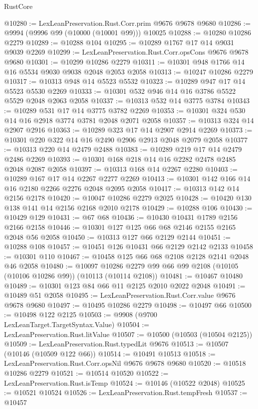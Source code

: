 \begin{lexlean}{RustCore}
\begin{coremodule}
@10280 := LexLeanPreservation.Rust.Corr.prim @9676 @9678 @9680
@10286 := @9994 (@9996 @99 (@10000 (@10001 @99))) @10025
@10288 := @10280 @10286 @2279
@10289 := @10288 @104
@10295 := @10289 @1767 @17 @14 @9031 @9039 @2269
@10299 := LexLeanPreservation.Rust.Corr.opsCons @9676 @9678 @9680
@10301 := @10299 @10286 @2279
@10311 := @10301 @948 @1766 @14 @16 @5534 @9030 @9038 @2048 @2053 @2058
@10313 := @10247 @10286 @2279
@10317 := @10313 @948 @14 @5523 @5532
@10323 := @10289 @947 @17 @14 @5523 @5530 @2269
@10333 := @10301 @532 @946 @14 @16 @3786 @5522 @5529 @2048 @2063 @2058
@10337 := @10313 @532 @14 @3775 @3784
@10343 := @10289 @531 @17 @14 @3775 @3782 @2269
@10353 := @10301 @324 @530 @14 @16 @2918 @3774 @3781 @2048 @2071 @2058
@10357 := @10313 @324 @14 @2907 @2916
@10363 := @10289 @323 @17 @14 @2907 @2914 @2269
@10373 := @10301 @220 @322 @14 @16 @2490 @2906 @2913 @2048 @2079 @2058
@10377 := @10313 @220 @14 @2479 @2488
@10383 := @10289 @219 @17 @14 @2479 @2486 @2269
@10393 := @10301 @168 @218 @14 @16 @2282 @2478 @2485 @2048 @2087 @2058
@10397 := @10313 @168 @14 @2267 @2280
@10403 := @10289 @167 @17 @14 @2267 @2277 @2269
@10413 := @10301 @142 @166 @14 @16 @2180 @2266 @2276 @2048 @2095 @2058
@10417 := @10313 @142 @14 @2156 @2178
@10420 := @10047 @10286 @2279 @2025
@10428 := @10420 @130 @138 @141 @14 @2156 @2168 @2010 @2178
@10429 := @10288 @106
@10430 := @10429 @129
@10431 := @67 @68
@10436 := @10430 @10431 @1789 @2156 @2166 @2158
@10446 := @10301 @127 @125 @66 @68 @2146 @2155 @2165 @2048 @56 @2058
@10450 := @10313 @127 @66 @2129 @2144
@10451 := @10288 @108
@10457 := @10451 @126 @10431 @66 @2129 @2142 @2133
@10458 := @10301 @110
@10467 := @10458 @125 @66 @68 @2108 @2128 @2141 @2048 @46 @2058
@10480 := @10097 @10286 @2279 @99 @66 @99 @2108 (@10105 (@10106 @10286 @99)) (@10113 (@10114 @2108))
@10481 := @10467 @10480
@10489 := @10301 @123 @84 @66 @11 @2125 @2010 @2022 @2048
@10491 := @10489 @51 @2058
@10495 := LexLeanPreservation.Rust.Corr.value @9676 @9678 @9680
@10497 := @10495 @10286 @2279
@10498 := @10497 @66
@10500 := @10498 @122 @2125
@10503 := @9908 (@9700 LexLeanTarget.TargetSyntax.Value)
@10504 := LexLeanPreservation.Rust.litValue
@10507 := @10500 (@10503 (@10504 @2125))
@10509 := LexLeanPreservation.Rust.typedLit @9676
@10513 := @10507 (@10146 (@10509 @122 @66))
@10514 := @10491 @10513
@10518 := LexLeanPreservation.Rust.Corr.opsNil @9676 @9678 @9680
@10520 := @10518 @10286 @2279
@10521 := @10514 @10520
@10522 := LexLeanPreservation.Rust.isTemp
@10524 := @10146 (@10522 @2048)
@10525 := @10521 @10524
@10526 := LexLeanPreservation.Rust.tempFresh
@10537 := @10457

\end{coremodule}
\end{lexlean}
